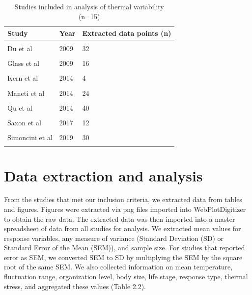 \documentclass[12pt,twoside]{reedthesis}
\begin{document}
\clearpage
\begin{table}[!h]

\caption{\label{tab:unnamed-chunk-8}Studies included in analysis of thermal variability (n=15)}
\centering
\begin{tabular}[t]{lll}
\toprule
\textbf{Study} & \textbf{Year} & \textbf{Extracted data points (n)}\\
\midrule
\cellcolor{gray!6}{Delava et al} & \cellcolor{gray!6}{2016} & \cellcolor{gray!6}{16}\\
Du et al & 2009 & 32\\
\cellcolor{gray!6}{Garcia-Ruiz et al} & \cellcolor{gray!6}{2011} & \cellcolor{gray!6}{16}\\
Glass et al & 2009 & 16\\
\cellcolor{gray!6}{Kern et al} & \cellcolor{gray!6}{2015} & \cellcolor{gray!6}{24}\\
\addlinespace
Kern et al & 2014 & 4\\
\cellcolor{gray!6}{Lowenborg et al} & \cellcolor{gray!6}{2012} & \cellcolor{gray!6}{10}\\
Maneti et al & 2014 & 24\\
\cellcolor{gray!6}{Pendlebury et al} & \cellcolor{gray!6}{2004} & \cellcolor{gray!6}{16}\\
Qu et al & 2014 & 40\\
\addlinespace
\cellcolor{gray!6}{Rolandi et al} & \cellcolor{gray!6}{2018} & \cellcolor{gray!6}{4}\\
Saxon et al & 2017 & 12\\
\cellcolor{gray!6}{Semenov et al} & \cellcolor{gray!6}{2007} & \cellcolor{gray!6}{32}\\
Simoncini et al & 2019 & 30\\
\cellcolor{gray!6}{Treidel et al} & \cellcolor{gray!6}{2015} & \cellcolor{gray!6}{4}\\
\bottomrule
\end{tabular}
\end{table}
\hypertarget{data-extraction-and-analysis}{%
\section{Data extraction and analysis}\label{data-extraction-and-analysis}}

From the studies that met our inclusion criteria, we extracted data from tables and figures. Figures were extracted via png files imported into WebPlotDigitizer to obtain the raw data. The extracted data was then imported into a master spreadsheet of data from all studies for analysis. We extracted mean values for response variables, any measure of variance (Standard Deviation (SD) or Standard Error of the Mean (SEM)), and sample size. For studies that reported error as SEM, we converted SEM to SD by multiplying the SEM by the square root of the same SEM. We also collected information on mean temperature, fluctuation range, organization level, body size, life stage, response type, thermal stress, and aggregated these values (Table 2.2).
\end{document}
